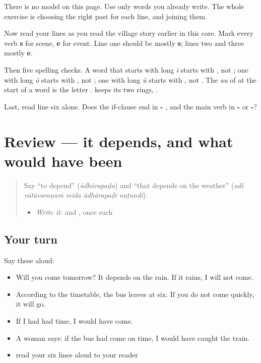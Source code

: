 There is no model on this page. Use only words you already write. The whole exercise is choosing the right past for each line, and joining them.

\begin{tcolorbox}[breakable,colback=teal!4,colframe=teal!35!black,title={Before you move on}]
Now read your lines as you read the village story earlier in this core. Mark every verb \textbf{s} for scene, \textbf{e} for event. Line one should be mostly \textbf{s}; lines two and three mostly \textbf{e}.

Then five spelling checks. A word that starts with long \emph{ī} starts with \textbf{}, not \textbf{}; one with long \emph{ō} starts with \textbf{}, not \textbf{}; one with long \emph{ū} starts with \textbf{}, not \textbf{}. The \emph{au} of \textbf{} at the start of a word is the letter \textbf{}. \textbf{} keeps its two rings, \textbf{}.

Last, read line six alone. Does the if-clause end in \textbf{- }, and the main verb in \textbf{-} or \textbf{-}?
\end{tcolorbox}
\section[(review)]{Review — it depends, and what would have been}

\label{lesson:TE-R325-depends-and-would}



\begin{quote}
Say \textquotedblleft{}to depend\textquotedblright{} (\emph{ādhārapaḍu}) and \textquotedblleft{}that depends on the weather\textquotedblright{} (\emph{adi vātāvaraṇaṁ mīda ādhārapaḍi uṇṭundi}).

\begin{itemize}
\raggedright
  \item \emph{Write it:} \textbf{} and \textbf{}, once each
\end{itemize}
\end{quote}

\subsection*{Your turn}
Say these aloud:

\begin{itemize}
\raggedright
  \item Will you come tomorrow? It depends on the rain. If it rains, I will not come.
  \item According to the timetable, the bus leaves at six. If you do not come quickly, it will go.
  \item If I had had time, I would have come.
  \item A woman says: if the bus had come on time, I would have caught the train.
  \item read your six lines aloud to your reader
\end{itemize}

